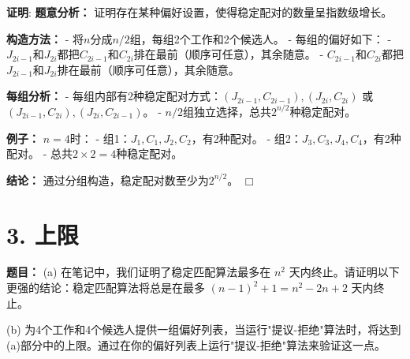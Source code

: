 \documentclass[11pt]{article}
\def\endproofmark{$\Box$}
\newenvironment{proof}{\par{\bf 证明}:}{\endproofmark\smallskip}
\begin{document}
\begin{proof}
\textbf{题意分析：} 证明存在某种偏好设置，使得稳定配对的数量呈指数级增长。

\textbf{构造方法：}
- 将$n$分成$n/2$组，每组2个工作和2个候选人。
- 每组的偏好如下：
  - $J_{2i-1}$和$J_{2i}$都把$C_{2i-1}$和$C_{2i}$排在最前（顺序可任意），其余随意。
  - $C_{2i-1}$和$C_{2i}$都把$J_{2i-1}$和$J_{2i}$排在最前（顺序可任意），其余随意。

\textbf{每组分析：}
- 每组内部有2种稳定配对方式：$(J_{2i-1},C_{2i-1}),(J_{2i},C_{2i})$ 或 $(J_{2i-1},C_{2i}),(J_{2i},C_{2i-1})$。
- $n/2$组独立选择，总共$2^{n/2}$种稳定配对。

\textbf{例子：} $n=4$时：
- 组1：$J_1,C_1,J_2,C_2$，有2种配对。
- 组2：$J_3,C_3,J_4,C_4$，有2种配对。
- 总共$2\times2=4$种稳定配对。

\textbf{结论：} 通过分组构造，稳定配对数至少为$2^{n/2}$。
\end{proof}

\section*{3. 上限}
\textbf{题目：}
(a) 在笔记中，我们证明了稳定匹配算法最多在 $n^{2}$ 天内终止。请证明以下更强的结论：稳定匹配算法将总是在最多 $(n-1)^{2}+1=n^{2}-2n+2$ 天内终止。

(b) 为4个工作和4个候选人提供一组偏好列表，当运行"提议-拒绝"算法时，将达到(a)部分中的上限。通过在你的偏好列表上运行"提议-拒绝"算法来验证这一点。
\end{document}
